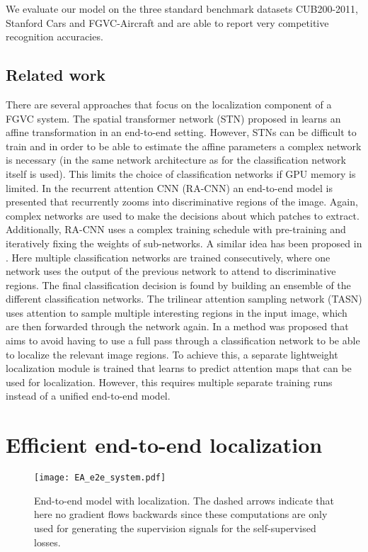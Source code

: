 \documentclass{bmvc2k}
\begin{document}
We evaluate our model on the three standard benchmark datasets CUB200-2011, Stanford Cars and FGVC-Aircraft and are able to report very competitive recognition accuracies.


\subsection{Related work}
There are several approaches that focus on the localization component of a FGVC system. The spatial transformer network (STN) proposed in \cite{jaderberg2015spatial} learns an affine transformation in an end-to-end setting. However, STNs can be difficult to train and in order to be able to estimate the affine parameters a complex network is necessary (in \cite{jaderberg2015spatial} the same network architecture as for the classification network itself is used). This limits the choice of classification networks if GPU memory is limited. 
In the recurrent attention CNN (RA-CNN) \cite{fu2017look} an end-to-end model is presented that recurrently zooms into discriminative regions of the image. Again, complex networks are used to make the decisions about which patches to extract. Additionally, RA-CNN uses a complex training schedule with pre-training and iteratively fixing the weights of sub-networks.
A similar idea has been proposed in \cite{simonelli2018increasingly}. Here multiple classification networks are trained consecutively, where one network uses the output of the previous network to attend to discriminative regions. The final classification decision is found by building an ensemble of the different classification networks.
The trilinear attention sampling network (TASN) \cite{zheng2019looking} uses attention to sample multiple interesting regions in the input image, which are then forwarded through the network again.
In \cite{Hanselmann_2020_WACV} a method was proposed that aims to avoid having to use a full pass through a classification network to be able to localize the relevant image regions. To achieve this, a separate lightweight localization module is trained that learns to predict attention maps that can be used for localization. However, this requires multiple separate training runs instead of a unified end-to-end model.



\section{Efficient end-to-end localization}
\label{sec:e2e}
\begin{figure}[t]
\begin{center}
   \texttt{[image: EA\_e2e\_system.pdf]}
\end{center}
   \caption{End-to-end model with localization. The dashed arrows indicate that here no gradient flows backwards since these computations are only used for generating the supervision signals for the self-supervised losses.}
\label{fig:e2e_fullsystem}
\end{figure}
\end{document}
